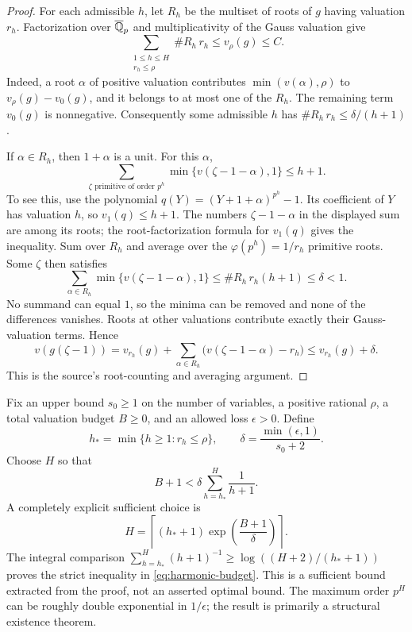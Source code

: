 \begin{proof}
For each admissible $h$, let $R_h$ be the multiset of roots of $g$ having
valuation $r_h$. Factorization over $\overline{\mathbb Q}_p$ and multiplicativity
of the Gauss valuation give
\[
 \sum_{\substack{1\le h\le H\\r_h\le\rho}}\#R_h\,r_h
 \le v_\rho(g)\le C.
\]
Indeed, a root $\alpha$ of positive valuation contributes
$\min(v(\alpha),\rho)$ to $v_\rho(g)-v_0(g)$, and it belongs to at most
one of the $R_h$. The remaining term $v_0(g)$ is nonnegative.
Consequently some admissible $h$ has
$\#R_h\,r_h\le\delta/(h+1)$.

If $\alpha\in R_h$, then $1+\alpha$ is a unit. For this $\alpha$,
\[
 \sum_{\zeta\text{ primitive of order }p^h}
      \min\{v(\zeta-1-\alpha),1\}\le h+1.
\]
To see this, use the polynomial
$q(Y)=(Y+1+\alpha)^{p^h}-1$. Its coefficient of $Y$ has valuation $h$,
so $v_1(q)\le h+1$. The numbers $\zeta-1-\alpha$ in the displayed sum
are among its roots; the root-factorization formula for $v_1(q)$ gives
the inequality. Sum over $R_h$ and average over the
$\varphi(p^h)=1/r_h$ primitive roots. Some $\zeta$ then satisfies
\[
 \sum_{\alpha\in R_h}\min\{v(\zeta-1-\alpha),1\}
 \le\#R_h\,r_h(h+1)\le\delta<1.
\]
No summand can equal $1$, so the minima can be removed and none of the
differences vanishes. Roots at other valuations contribute exactly their
Gauss-valuation terms. Hence
\[
 v(g(\zeta-1))
 =v_{r_h}(g)+\sum_{\alpha\in R_h}
       \bigl(v(\zeta-1-\alpha)-r_h\bigr)
 \le v_{r_h}(g)+\delta.
\]
This is the source's root-counting and averaging argument.
\end{proof}

Fix an upper bound $s_0\ge1$ on the number of variables, a positive
rational $\rho$, a total valuation budget $B\ge0$, and an allowed loss
$\epsilon>0$. Define
\begin{equation}
\label{eq:torsion-parameters}
 h_* = \min\{h\ge1:r_h\le\rho\},\qquad
 \delta=\frac{\min(\epsilon,1)}{s_0+2}.
\end{equation}
Choose $H$ so that
\begin{equation}
\label{eq:harmonic-budget}
 B+1<\delta\sum_{h=h_*}^{H}\frac1{h+1}.
\end{equation}
A completely explicit sufficient choice is
\begin{equation}
\label{eq:explicit-torsion-height}
 H=\left\lceil(h_*+1)
             \exp\!\left(\frac{B+1}{\delta}\right)\right\rceil.
\end{equation}
The integral comparison
$\sum_{h=h_*}^{H}(h+1)^{-1}\ge
\log((H+2)/(h_*+1))$ proves the strict inequality in
\eqref{eq:harmonic-budget}. This is a sufficient bound extracted from
the proof, not an asserted optimal bound. The maximum order $p^H$ can
be roughly double exponential in $1/\epsilon$; the result is primarily
a structural existence theorem.

